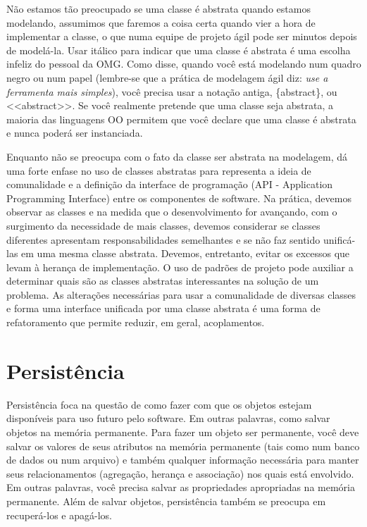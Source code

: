 \documentclass[
	11pt,				%
	openright,
	twoside,			%
	a4paper,			%
	english,			%
	french,
	brazil,				%
	sumario=tradicional
	]{abntex2}
\begin{document}
Não estamos tão preocupado se uma classe é abstrata quando estamos modelando, assumimos que faremos a coisa certa quando vier a hora de implementar a classe, o que numa equipe de projeto ágil pode ser minutos depois de modelá-la. Usar itálico para indicar que uma classe é abstrata é uma escolha infeliz do pessoal da OMG. Como \cite{uml:destilado} disse, quando você está modelando num quadro negro ou num papel (lembre-se que a prática de modelagem ágil diz: \textit{use a ferramenta mais simples}), você precisa usar a notação antiga, \{abstract\}, ou <<abstract>>. Se você realmente pretende que uma classe seja abstrata, a maioria das linguagens OO permitem que você declare que uma classe é abstrata e nunca poderá ser instanciada.

Enquanto \cite{Ambler:TOP:3ed} não se preocupa com o fato da classe ser abstrata na modelagem, \cite{DP:explained} dá uma forte enfase no uso de classes abstratas para representa a ideia de comunalidade e a definição da interface de programação (API - Application Programming Interface) entre os componentes de software. Na prática, devemos observar as classes e na medida que o desenvolvimento for avançando, com o surgimento da necessidade de mais classes, devemos considerar se classes diferentes apresentam responsabilidades semelhantes e se não faz sentido unificá-las em uma mesma classe abstrata. Devemos, entretanto, evitar os excessos que levam à herança de implementação. O uso de padrões de projeto pode auxiliar a determinar quais são as classes abstratas interessantes na solução de um problema. As alterações necessárias para usar a comunalidade de diversas classes e forma uma interface unificada por uma classe abstrata é uma forma de refatoramento que permite reduzir, em geral, acoplamentos.

\section{Persistência}

Persistência foca na questão de como fazer com que os objetos estejam disponíveis para uso futuro pelo software. Em outras palavras, como salvar objetos na memória permanente. Para fazer um objeto ser permanente, você deve salvar os valores de seus atributos na memória permanente (tais como num banco de dados ou num arquivo) e também qualquer informação necessária para manter seus relacionamentos (agregação, herança e associação) nos quais está envolvido. Em outras palavras, você precisa salvar as propriedades apropriadas na memória permanente. Além de salvar objetos, persistência também se preocupa em recuperá-los e apagá-los.
\end{document}
